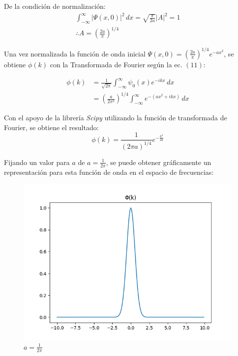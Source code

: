 De la condición de normalización:
\begin{gather*}
    \int_{-\infty}^{\infty} \lvert\Psi(x,0)\rvert^2\,dx = \sqrt{\frac{\pi}{2a}} \lvert A \rvert^2 = 1 \\
    \therefore A = \left (\frac{2a}{\pi}\right )^{1/4}
\end{gather*}

Una vez normalizada la función de onda inicial $\Psi(x,0) = \left (\frac{2a}{\pi}\right )^{1/4} e^{-ax^2}$, se obtiene 
$\phi(k)$ con la Transformada de Fourier según la ec. $(11)$:

\begin{align*}
    \phi(k) &= \frac{1}{\sqrt{2\pi}} \int_{-\infty}^{\infty} \psi_{0}(x)e^{-ikx}\,dx \\
    &= \left(\frac{a}{2\pi^3}\right)^{1/4} \int_{-\infty}^{\infty} e^{-(ax^2+ikx)}\,dx
\end{align*}

Con el apoyo de la librería \emph{Scipy} utilizando la función de transformada de Fourier, se obtiene el resultado:
\begin{equation}
    \phi(k) = \frac{1}{(2\pi a)^{1/4}} e^{-\frac{k^2}{4a}}
\end{equation}

Fijando un valor para $a$ de $a=\frac{1}{2\pi}$, se puede obtener gráficamente un representación para esta función de 
onda en el espacio de frecuencias:\\

\begin{figure}[H]
    \includegraphics[scale=0.45]{imagenes/graficas_particulalibre/phi(k).png}
    \caption{\emph{$a = \frac{1}{2\pi}$}}
\end{figure}

